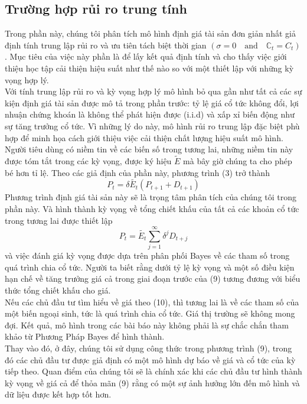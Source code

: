 \documentclass[10pt,a4paper]{article}
\begin{document}
	\subsection{Trường hợp rủi ro trung tính}
	Trong phần này, chúng tôi phân tích mô hình định giá tài sản đơn giản nhất giả định tính trung lập rủi ro và ưu tiên tách biệt thời gian $(\sigma=0\quad\text{and}\quad \mathbb{C}_t=C_t)$.
	Mục tiêu của việc này phần là để lấy kết quả định tính và cho thấy việc giới thiệu học tập cải thiện hiệu suất như thế nào so với một thiết lập với những kỳ vọng hợp lý.\\
	Với tính trung lập rủi ro và kỳ vọng hợp lý mô hình bỏ qua gần như tất cả các sự kiện định giá tài sản được mô tả trong phần trước: tỷ lệ giá cổ tức không đổi, lợi nhuận chứng khoán là không thể phát hiện được (i.i.d) và xấp xỉ biến động như sự tăng trưởng cổ tức. Vì những lý do này, mô hình  rủi ro trung lập đặc biệt phù hợp để minh họa cách giới thiệu việc cải thiện chất lượng hiệu suất mô hình.\\
	
	Người tiêu dùng có niềm tin về các biến số trong tương lai, những niềm tin này được tóm tắt trong các kỳ vọng, được ký hiệu $\tilde{E}$ mà bây giờ chúng ta cho phép bé hơn tỉ lệ. Theo các giả định của phần này, phương trình (3) trở thành
	\begin{equation}
	P_t=\delta\tilde{E_t}(P_{t+1}+D_{t+1})
	\end{equation}
	Phương trình định giá tài sản này sẽ là trọng tâm phân tích của chúng tôi trong phần này. Và 
	hình thành kỳ vọng về tổng chiết khấu của tất cả các khoản cổ tức trong tương lai được thiết lập
	\begin{equation}
	P_t=\tilde{E_t}\sum_{j=1}^{\infty}\delta^jD_{t+j}
	\end{equation}
	và việc đánh giá kỳ vọng được dựa trên phân phối Bayes về các tham số trong quá trình chia cổ tức.
	Người ta biết rằng dưới tỷ lệ kỳ vọng và một số điều kiện hạn chế về tăng trưởng giá cả trong giai đoạn trước của (9) tương đương với biểu thức tổng chiết khấu cho giá.\\
	Nếu các chủ đầu tư tìm hiểu về giá theo (10), thì tương lai là về các tham số của một biến ngoại sinh, tức là quá trình chia cổ tức. Giá thị trường sẽ không mong đợi. Kết quả, mô hình trong các bài báo này không phải là sự chắc chắn tham khảo từ Phương Pháp Bayes để hình thành.\\
	Thay vào đó, ở đây, chúng tôi sử dụng công thức trong phương trình (9), trong đó các chủ đầu tư được giả định có một mô hình dự báo về giá và cổ tức của kỳ tiếp theo. Quan điểm của chúng tôi sẽ là chính xác khi các chủ đầu tư  hình thành kỳ vọng về giá cả để thỏa mãn (9) rằng có một sự ảnh hưởng lớn đến mô hình và dữ liệu được kết hợp tốt hơn.\\
	
\end{document}
